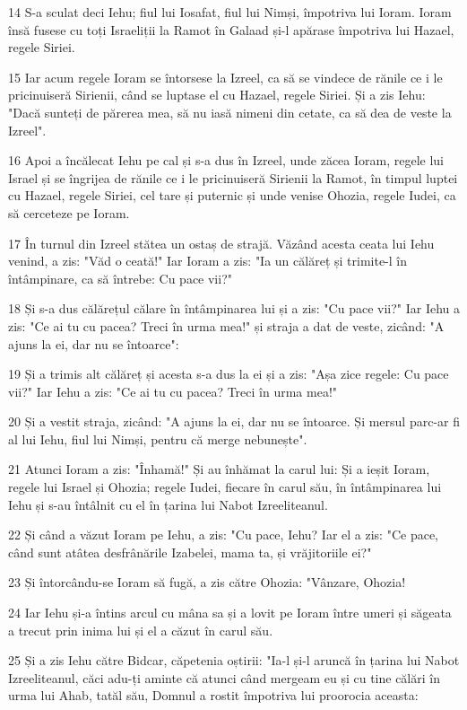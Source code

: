 \par 14 S-a sculat deci Iehu; fiul lui Iosafat, fiul lui Nimși, împotriva lui Ioram. Ioram însă fusese cu toți Israeliții la Ramot în Galaad și-l apărase împotriva lui Hazael, regele Siriei.
\par 15 Iar acum regele Ioram se întorsese la Izreel, ca să se vindece de rănile ce i le pricinuiseră Sirienii, când se luptase el cu Hazael, regele Siriei. Și a zis Iehu: "Dacă sunteți de părerea mea, să nu iasă nimeni din cetate, ca să dea de veste la Izreel".
\par 16 Apoi a încălecat Iehu pe cal și s-a dus în Izreel, unde zăcea Ioram, regele lui Israel și se îngrijea de rănile ce i le pricinuiseră Sirienii la Ramot, în timpul luptei cu Hazael, regele Siriei, cel tare și puternic și unde venise Ohozia, regele Iudei, ca să cerceteze pe Ioram.
\par 17 În turnul din Izreel stătea un ostaș de strajă. Văzând acesta ceata lui Iehu venind, a zis: "Văd o ceată!" Iar Ioram a zis: "Ia un călăreț și trimite-l în întâmpinare, ca să întrebe: Cu pace vii?"
\par 18 Și s-a dus călărețul călare în întâmpinarea lui și a zis: "Cu pace vii?" Iar Iehu a zis: "Ce ai tu cu pacea? Treci în urma mea!" și straja a dat de veste, zicând: "A ajuns la ei, dar nu se întoarce":
\par 19 Și a trimis alt călăreț și acesta s-a dus la ei și a zis: "Așa zice regele: Cu pace vii?" Iar Iehu a zis: "Ce ai tu cu pacea? Treci în urma mea!"
\par 20 Și a vestit straja, zicând: "A ajuns la ei, dar nu se întoarce. Și mersul parc-ar fi al lui Iehu, fiul lui Nimși, pentru că merge nebunește".
\par 21 Atunci Ioram a zis: "Înhamă!" Și au înhămat la carul lui: Și a ieșit Ioram, regele lui Israel și Ohozia; regele Iudei, fiecare în carul său, în întâmpinarea lui Iehu și s-au întâlnit cu el în țarina lui Nabot Izreeliteanul.
\par 22 Și când a văzut Ioram pe Iehu, a zis: "Cu pace, Iehu? Iar el a zis: "Ce pace, când sunt atâtea desfrânările Izabelei, mama ta, și vrăjitoriile ei?"
\par 23 Și întorcându-se Ioram să fugă, a zis către Ohozia: "Vânzare, Ohozia!
\par 24 Iar Iehu și-a întins arcul cu mâna sa și a lovit pe Ioram între umeri și săgeata a trecut prin inima lui și el a căzut în carul său.
\par 25 Și a zis Iehu către Bidcar, căpetenia oștirii: "Ia-l și-l aruncă în țarina lui Nabot Izreeliteanul, căci adu-ți aminte că atunci când mergeam eu și cu tine călări în urma lui Ahab, tatăl său, Domnul a rostit împotriva lui proorocia aceasta:
